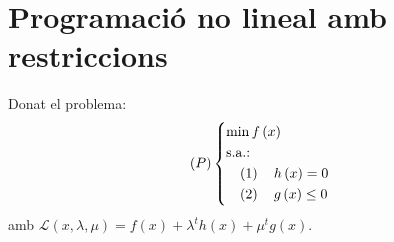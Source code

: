 \section{Programaci\'o no lineal amb restriccions}

Donat el problema:
\begin{equation*}
    \lp P \rp \begin{dcases*}
        \min f \left( x \right) \\
        \text{s.a.: } \\
        \quad \left( 1 \right) \quad h \left( x \right) = 0 \\
        \quad \left( 2 \right) \quad g \left( x \right) \leq 0 \\
    \end{dcases*}
\end{equation*}
amb $\mathcal{L} \left( x, \lambda, \mu \right) = f\left( x \right) + \lambda^t h\left( x \right) + \mu^t g\left( x \right)$.

